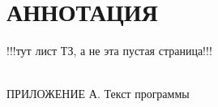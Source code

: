 

\newpage
\section*{АННОТАЦИЯ}


\newpage
!!!тут лист ТЗ, а не эта пустая страница!!!

\newpage
{}
\tableofcontents
\hspace{0pt}\\
ПРИЛОЖЕНИЕ А. Текст программы

\newcommand{\GPRPhantomSection}[2]{{
    \newpage
    \phantomsection
    \addcontentsline{toc}{section}{#1}
    \section*{#1}
    
    \newpage
}}
\newcommand{\GPRSection}[2]{{
    \def \VarGPRSection {#2}
    \newpage
    \section{#1}
    
    \newpage
}}
\newcommand{\GPRSectionFile}[2]{{
    \def \VarGPRSection {#2}
    \newpage
    \section{#1}
    
    \newpage
}}
\newcommand{\GPRSubSection}[2]{{
    \subsection{#1}
    
}}
\newcommand{\GPRImage}[4]{{
    \begin{figure}[H] %
        \centering
    
        \texttt{[image: \#3]}
    
        \caption{#2}
    
        \label{fig:#1}
    \end{figure}
}}
\newcommand{\GPRSeeImageRef}[1]{{
    (см. рисунок \ref{fig:#1}.)
}}

